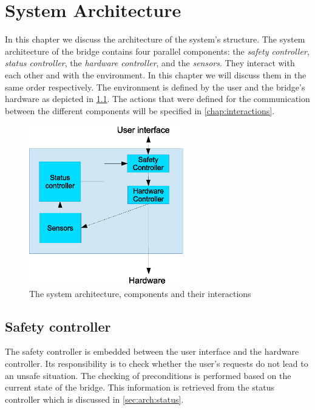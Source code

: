 \chapter{System Architecture} \label{chap:systemarchitecture}
    In this chapter we discuss the architecture of the system's structure. The system architecture of the bridge contains four parallel components: the
	{\em safety controller}, {\em status controller}, the {\em hardware
	controller}, and the {\em sensors}. 
	They interact with each other and with the environment. 
	In this chapter we will discuss them in the same order respectively. 
	The	environment is defined by the user and the bridge's hardware as depicted in \cref{fig:arch}.
	The actions that were defined for the communication between the different components will be specified in \cref{chap:interactions}.
	
	\begin{figure}[htbp]
		\begin{center}
		\includegraphics[width=0.6\textwidth]{./images/system-architecture.eps}
		\caption{The system architecture, components and their interactions}
		\label{fig:arch}
		\end{center}
	\end{figure}
	
	
	\section{Safety controller}
		The safety controller is embedded between the user interface and the hardware
		controller. 
		Its responsibility is to check whether the user's requests do not
		lead to an unsafe situation. 
		The checking of preconditions is performed based on the current state of the bridge.
		This information is retrieved from the status controller which is discussed in \cref{sec:arch:status}.
		
